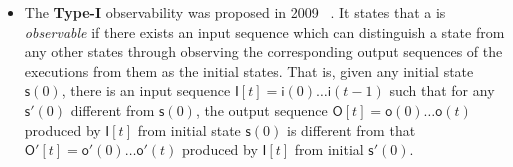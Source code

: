 
\begin{itemize}
\item The  {\bf Type-I}  observability was proposed in 2009 ~\cite{cheng2009controllability}. It states that a {\BCN} is {\em observable} if there exists an input sequence  which can distinguish a state  from any other  states through observing the corresponding output sequences of the executions from them  as the initial states. That is,  given any initial state $\mathsf{s}(0)$, there is an input sequence $\mathsf{I}[t]=\mathsf{i}(0)\ldots\mathsf{i}(t-1)$  such that  for any  $\mathsf{s}'(0)$ different from $\mathsf{s}(0)$, the output sequence  $\mathsf{O}[t]=\mathsf{o}(0)\ldots\mathsf{o}(t)$ produced by  $\mathsf{I}[t]$ from initial state $\mathsf{s}(0)$ is different from that   $\mathsf{O}'[t]=\mathsf{o}'(0)\ldots \mathsf{o}'(t)$ produced by $\mathsf{I}[t]$ from initial $\mathsf{s}'(0)$.

	

\end{itemize}
